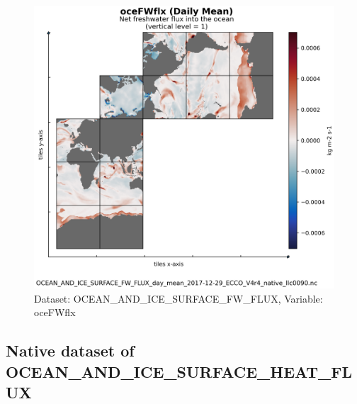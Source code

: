 \begin{figure}[H]
\centering
\includegraphics[scale=0.55]{../images/plots/native_plots/Ocean_and_Sea-Ice_Surface_Freshwater_Fluxes/oceFWflx.png}
\caption{Dataset: OCEAN\_AND\_ICE\_SURFACE\_FW\_FLUX, Variable: oceFWflx}
\label{tab:table-OCEAN_AND_ICE_SURFACE_FW_FLUX_oceFWflx-Plot}
\end{figure}
\newpage
\subsection{Native dataset of OCEAN\_AND\_ICE\_SURFACE\_HEAT\_FLUX}
\newp
